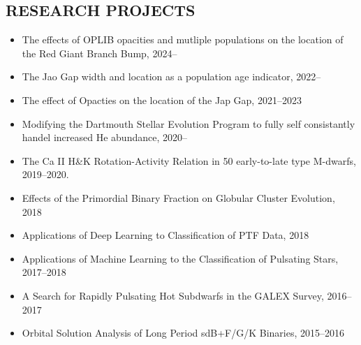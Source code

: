 \documentclass[margin, 10pt]{res} %
\begin{document}
\begin{resume}
\section{RESEARCH PROJECTS}
\begin{itemize}
  \item The effects of OPLIB opacities and mutliple populations on the location of the Red Giant Branch Bump, 2024--
	\item The Jao Gap width and location as a population age indicator, 2022--
	\item The effect of Opacties on the location of the Jap Gap, 2021--2023
	\item Modifying the Dartmouth Stellar Evolution Program to fully self consistantly handel increased He abundance, 2020--
	\item The Ca II H\&K Rotation-Activity Relation in 50 early-to-late type M-dwarfs, 2019--2020.
  \item Effects of the Primordial Binary Fraction on Globular Cluster Evolution, 2018
	\item Applications of Deep Learning to Classification of PTF Data, 2018
  \item Applications of Machine Learning to the Classification of Pulsating Stars, 2017--2018
  \item A Search for Rapidly Pulsating Hot Subdwarfs in the GALEX Survey, 2016--2017
  \item Orbital Solution Analysis of Long Period sdB+F/G/K Binaries, 2015--2016
\end{itemize}


\end{resume}
\end{document}
